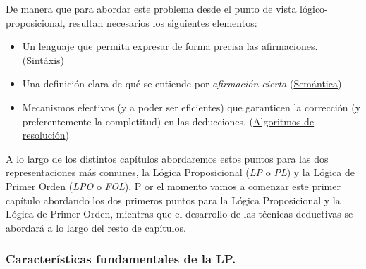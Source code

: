\documentclass[a4paper]{report}
\begin{document}
De manera que para abordar este problema desde el punto de vista lógico-proposicional, resultan necesarios los siguientes elementos:

\begin{itemize}
\item Un lenguaje que permita expresar de forma precisa las afirmaciones. (\underline{Sintáxis})

\item Una definición clara de qué se entiende por \textit{afirmación cierta} (\underline{Semántica})

\item Mecanismos efectivos (y a poder ser eficientes) que garanticen la corrección (y preferentemente la completitud) en las deducciones. (\underline{Algoritmos de resolución})
\end{itemize}

A lo largo de los distintos capítulos abordaremos estos puntos para las dos representaciones más comunes, la Lógica Proposicional (\textit{LP} o \textit{PL}) y la Lógica de Primer Orden (\textit{LPO} o \textit{FOL}).
P
or el momento vamos a comenzar este primer capítulo abordando los dos primeros puntos para la Lógica Proposicional y la Lógica de Primer Orden, mientras que el desarrollo de las técnicas deductivas se abordará a lo largo del resto de capítulos.

\subsubsection{Características fundamentales de la LP.}
\end{document}
